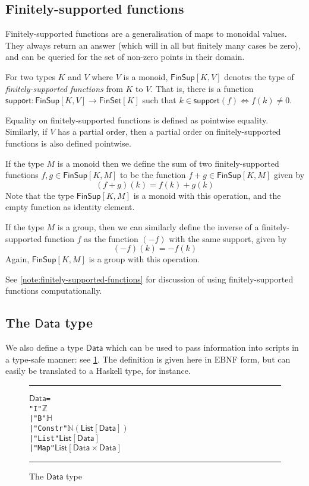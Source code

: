\documentclass[a4paper]{article}
\newcounter{note}
\newcommand{\s}{\textsf}  %
\newcommand{\msf}[1]{\ensuremath{\mathsf{#1}}}
\newcommand\rfskip{7pt}
\newenvironment{ruledfigure}[1]{\begin{figure}[#1]\hrule\vspace{\rfskip}}{\vspace{\rfskip}\hrule\end{figure}}
\newcommand{\List}[1]{\ensuremath{\s{List}[#1]}}
\newcommand{\FinSet}[1]{\ensuremath{\s{FinSet}[#1]}}
\newcommand{\FinSup}[2]{\ensuremath{\s{FinSup}[#1,#2]}}
\newcommand{\support}{\msf{support}}
\newcommand{\Data}{\ensuremath{\s{Data}}}
\newcommand\N{\ensuremath{\mathbb{N}}}
\newcommand\Z{\ensuremath{\mathbb{Z}}}
\renewcommand\H{\ensuremath{\mathbb{H}}}
\begin{document}
\subsection {Finitely-supported functions}
\label{sec:fsfs}

Finitely-supported functions are a generalisation of maps to monoidal values.
They always return an answer (which will in all but finitely many cases be
zero), and can be queried for the set of non-zero points in their domain.

For two types $K$ and $V$ where $V$ is a monoid, $\FinSup{K}{V}$ denotes the type of
\textit{finitely-supported functions} from $K$ to $V$. That is, there is a
function $\support : \FinSup{K}{V} \rightarrow \FinSet{K}$ such that
$k \in \support(f) \Leftrightarrow f(k) \neq 0$.

Equality on finitely-supported functions is defined as pointwise equality. Similarly,
if $V$ has a partial order, then a partial order on finitely-supported functions
is also defined pointwise.

If the type $M$ is a monoid then we define the sum of two finitely-supported
functions
$f, g \in \FinSup{K}{M}$ to be the function $f+g \in \FinSup{K}{M}$ given by
\[(f+g)(k) = f(k) + g(k) \]
Note that the type $\FinSup{K}{M}$ is a monoid with this
operation, and the empty function as
identity element.

If the type $M$ is a group, then we can
similarly define the inverse of a finitely-supported function $f$ as
the function $(-f)$ with the same support, given by
\[ (-f)(k) = -f(k) \]
Again, $\FinSup{K}{M}$ is a group with this operation.

\smallskip

See \cref{note:finitely-supported-functions} for discussion of using
finitely-supported functions computationally.

\subsection{The \Data{} type}
We also define a type \Data{} which can be used to pass information
into scripts in a type-safe manner: see \cref{fig:data-defn}. The
definition is given here in EBNF form, but can easily be translated to
a Haskell type, for instance.

\begin{ruledfigure}{H}
\begin{alltt}
  \Data =
      "I" \(\Z\)
    | "B" \(\H\)
    | "Constr" \(\N (\List{\Data})\)
    | "List" \(\List{\Data}\)
    | "Map" \(\List{\Data\times\Data}\)
\end{alltt}
\caption{The \Data{} type}
\label{fig:data-defn}
\end{ruledfigure}
\end{document}
